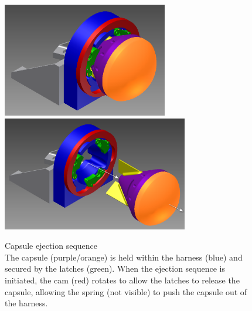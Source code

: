 \documentclass{article}
\begin{document}
	\begin{figure}[H]
	\begin{center}
		\includegraphics[height=5cm]{HarnessLaunch1}
		\includegraphics[height=5cm]{HarnessLaunch2}\\
	\end{center}
		\caption{}
		\label{ejection}
Capsule ejection sequence\\ The capsule (purple/orange) is held within the harness (blue) and secured by the latches (green). When the ejection sequence is initiated, the cam (red) rotates to allow the latches to release the capsule, allowing the spring (not visible) to push the capsule out of the harness.
	\end{figure}
\end{document}
